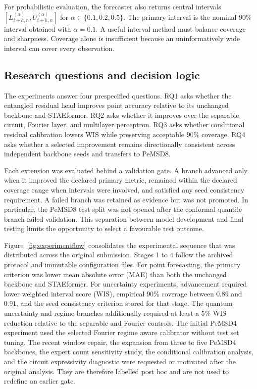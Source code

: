 \documentclass[pdflatex,sn-mathphys-num]{sn-jnl}
\begin{document}
For probabilistic evaluation, the forecaster also returns central intervals
\(\left[L^{(\alpha)}_{t+h,n},U^{(\alpha)}_{t+h,n}\right]\) for
\(\alpha\in\{0.1,0.2,0.5\}\). The primary interval is the nominal \(90\%\) interval obtained with \(\alpha=0.1\). A useful interval method must balance coverage and sharpness. Coverage alone is insufficient because an uninformatively wide interval can cover every observation.

\subsection{Research questions and decision logic}\label{subsec:questions}

The experiments answer four prespecified questions. RQ1 asks whether the entangled residual head improves point accuracy relative to its unchanged backbone and STAEformer. RQ2 asks whether it improves over the separable circuit, Fourier layer, and multilayer perceptron. RQ3 asks whether conditional residual calibration lowers WIS while preserving acceptable \(90\%\) coverage. RQ4 asks whether a selected improvement remains directionally consistent across independent backbone seeds and transfers to PeMSD8.

Each extension was evaluated behind a validation gate. A branch advanced only when it improved the declared primary metric, remained within the declared coverage range when intervals were involved, and satisfied any seed consistency requirement. A failed branch was retained as evidence but was not promoted. In particular, the PeMSD8 test split was not opened after the conformal quantile branch failed validation. This separation between model development and final testing limits the opportunity to select a favourable test outcome.

Figure~\ref{fig:experimentflow} consolidates the experimental sequence that was distributed across the original submission. Stages 1 to 4 follow the archived protocol and immutable configuration files. For point forecasting, the primary criterion was lower mean absolute error (MAE) than both the unchanged backbone and STAEformer. For uncertainty experiments, advancement required lower weighted interval score (WIS), empirical $90\%$ coverage between $0.89$ and $0.91$, and the seed consistency criterion stored for that stage. The quantum uncertainty and regime branches additionally required at least a $5\%$ WIS reduction relative to the separable and Fourier controls. The initial PeMSD4 experiment used the selected Fourier regime aware calibrator without test set tuning. The recent window repair, the expansion from three to five PeMSD4 backbones, the expert count sensitivity study, the conditional calibration analysis, and the circuit expressivity diagnostic were requested or motivated after the original analysis. They are therefore labelled post hoc and are not used to redefine an earlier gate.
\end{document}
